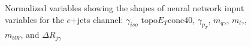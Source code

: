 \begin{figure}[h!]
\vspace{-4.5mm}
\hfil
{}
\caption{Normalized variables showing the shapes of neural network input variables for the $e$+jets channel: $\gamma_{iso}$ topo$E_{T}$cone40, $\gamma_{p_T}$, $m_{q \gamma}$, $m_{l \gamma}$, $m_{bW}$, and $\Delta R_{j\gamma}$ }
\label{fig:VarPlotsej1}
\end{figure}

